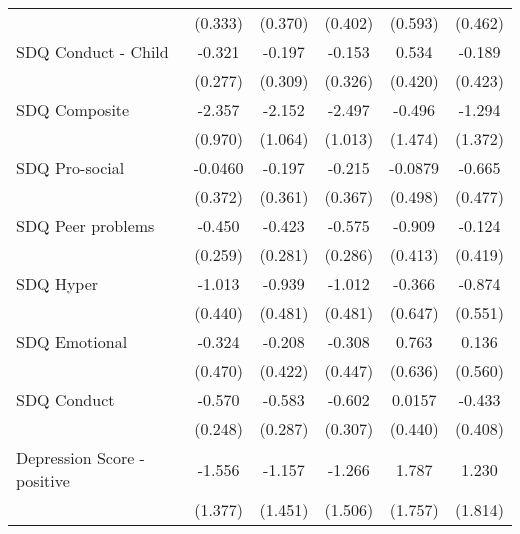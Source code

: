 {\begin{tabular}{l*{5}{c}}
            &     (0.333)         &     (0.370)         &     (0.402)         &     (0.593)         &     (0.462)         \\
\addlinespace
SDQ Conduct - Child&      -0.321         &      -0.197         &      -0.153         &       0.534         &      -0.189         \\
            &     (0.277)         &     (0.309)         &     (0.326)         &     (0.420)         &     (0.423)         \\
\addlinespace
SDQ Composite&      -2.357\sym{*}  &      -2.152\sym{*}  &      -2.497\sym{*}  &      -0.496         &      -1.294         \\
            &     (0.970)         &     (1.064)         &     (1.013)         &     (1.474)         &     (1.372)         \\
\addlinespace
SDQ Pro-social&     -0.0460         &      -0.197         &      -0.215         &     -0.0879         &      -0.665         \\
            &     (0.372)         &     (0.361)         &     (0.367)         &     (0.498)         &     (0.477)         \\
\addlinespace
SDQ Peer problems&      -0.450         &      -0.423         &      -0.575\sym{*}  &      -0.909\sym{*}  &      -0.124         \\
            &     (0.259)         &     (0.281)         &     (0.286)         &     (0.413)         &     (0.419)         \\
\addlinespace
SDQ Hyper   &      -1.013\sym{*}  &      -0.939         &      -1.012\sym{*}  &      -0.366         &      -0.874         \\
            &     (0.440)         &     (0.481)         &     (0.481)         &     (0.647)         &     (0.551)         \\
\addlinespace
SDQ Emotional&      -0.324         &      -0.208         &      -0.308         &       0.763         &       0.136         \\
            &     (0.470)         &     (0.422)         &     (0.447)         &     (0.636)         &     (0.560)         \\
\addlinespace
SDQ Conduct &      -0.570\sym{*}  &      -0.583\sym{*}  &      -0.602         &      0.0157         &      -0.433         \\
            &     (0.248)         &     (0.287)         &     (0.307)         &     (0.440)         &     (0.408)         \\
\addlinespace
Depression Score - positive&      -1.556         &      -1.157         &      -1.266         &       1.787         &       1.230         \\
            &     (1.377)         &     (1.451)         &     (1.506)         &     (1.757)         &     (1.814)         \\
\bottomrule
\end{tabular}
}
